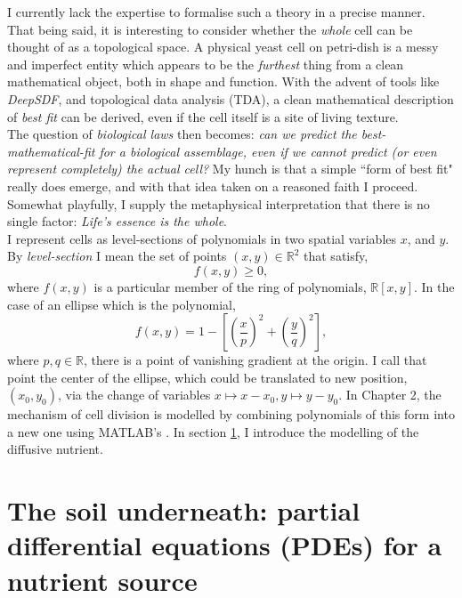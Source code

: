 I currently lack the expertise to formalise 
such a theory in a precise manner. That being said, 
it is interesting to consider whether the \textit{whole}
cell can be thought of as a topological space. A physical
yeast cell on petri-dish is a messy and imperfect 
entity which appears to be the \textit{furthest} thing from 
a clean mathematical object, both in shape and function.
With the advent of tools like \textit{DeepSDF}, and topological 
data analysis (TDA), a clean mathematical description
of \textit{best fit} can be derived, even if the cell itself 
is a site of living texture. 
\\

The question of \textit{biological laws} 
then becomes: \textit{can we predict the best-mathematical-fit
for a biological assemblage, even if we cannot predict (or even 
represent completely) the actual cell?}
My hunch is that a simple ``form of best fit" really does emerge, 
and with that idea taken on a reasoned faith I proceed. Somewhat 
playfully, I supply the metaphysical interpretation that 
there is no single factor: 
\textit{Life's essence is the whole}.
\\

I represent cells as 
level-sections of polynomials in two spatial 
variables $x$, and $y$. By \textit{level-section} I mean the set of points 
$(x,y) \in \mathbb{R}^2$ that satisfy,
\begin{equation*}
    f(x,y) \geq 0,
\end{equation*}
where $f(x,y)$ is a particular member of the ring of polynomials, $\mathbb{R}[x,y]$.
In the case of an ellipse which is the polynomial, 
\begin{equation*}
    f(x,y) = 1 - \left[\left( \frac{x}{p}\right)^2 + \left( \frac{y}{q}\right)^2\right],
\end{equation*}
where $p,q \in \mathbb{R}$, there is a point of vanishing gradient at the origin. I call 
that point the center of the ellipse, which could be translated 
to new position, $(x_0,y_0)$, via the change of variables $x \mapsto x-x_0, y \mapsto y-y_0.$
In Chapter 2, the mechanism of cell division is modelled by 
combining polynomials of this form into a new one using MATLAB's . 
In section \ref{sec:turingPatterns}, 
I introduce the modelling of the diffusive nutrient.


\section{The soil underneath: partial differential 
equations (PDEs) for a nutrient source} \label{sec:turingPatterns}

